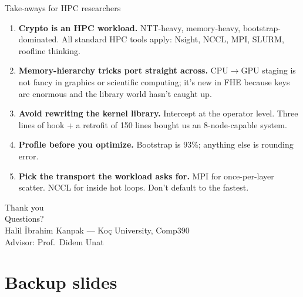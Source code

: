 \documentclass[aspectratio=169]{beamer}
\begin{document}
\begin{frame}{Take-aways for HPC researchers}
  \begin{enumerate}
    \item \textbf{Crypto is an HPC workload.} NTT-heavy, memory-heavy,
          bootstrap-dominated. All standard HPC tools apply: Nsight, NCCL,
          MPI, SLURM, roofline thinking.
    \item \textbf{Memory-hierarchy tricks port straight across.}
          CPU$\to$GPU staging is not fancy in graphics or scientific computing;
          it's new in FHE because keys are enormous and the library world
          hasn't caught up.
    \item \textbf{Avoid rewriting the kernel library.} Intercept at the operator level.
          Three lines of hook + a retrofit of 150 lines bought us an 8-node-capable system.
    \item \textbf{Profile before you optimize.} Bootstrap is 93\%; anything else
          is rounding error.
    \item \textbf{Pick the transport the workload asks for.}
          MPI for once-per-layer scatter. NCCL for inside hot loops. Don't default to the fastest.
  \end{enumerate}
\end{frame}

\begin{frame}[plain]
  \begin{center}
    {\Huge Thank you}\\[1em]
    {\Large Questions?}\\[2em]
    \small Halil İbrahim Kanpak — Koç University, Comp390 \\
    Advisor: Prof.\ Didem Unat
  \end{center}
\end{frame}

\appendix
\section*{Backup slides}
\end{document}
